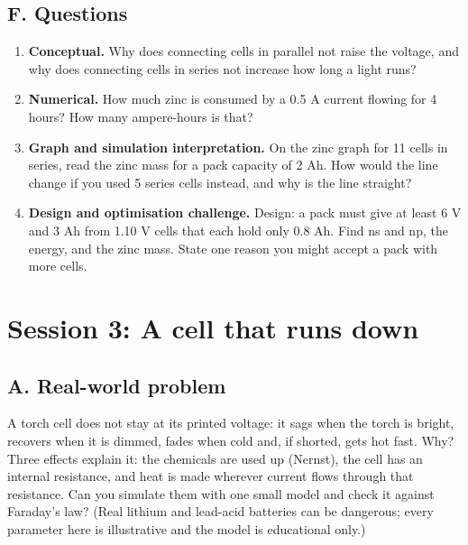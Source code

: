 \documentclass[11pt,a4paper]{article}
\begin{document}
\subsection*{F. Questions}
\begin{enumerate}[nosep]
\item \textbf{Conceptual.} Why does connecting cells in parallel not raise the voltage, and why does connecting cells in series not increase how long a light runs?
\item \textbf{Numerical.} How much zinc is consumed by a 0.5 A current flowing for 4 hours? How many ampere-hours is that?
\item \textbf{Graph and simulation interpretation.} On the zinc graph for 11 cells in series, read the zinc mass for a pack capacity of 2 Ah. How would the line change if you used 5 series cells instead, and why is the line straight?
\item \textbf{Design and optimisation challenge.} Design: a pack must give at least 6 V and 3 Ah from 1.10 V cells that each hold only 0.8 Ah. Find ns and np, the energy, and the zinc mass. State one reason you might accept a pack with more cells.
\end{enumerate}

\section{Session 3: A cell that runs down}

\subsection*{A. Real-world problem}
A torch cell does not stay at its printed voltage: it sags when the torch is bright, recovers when it is dimmed, fades when cold and, if shorted, gets hot fast. Why? Three effects explain it: the chemicals are used up (Nernst), the cell has an internal resistance, and heat is made wherever current flows through that resistance. Can you simulate them with one small model and check it against Faraday's law? (Real lithium and lead-acid batteries can be dangerous; every parameter here is illustrative and the model is educational only.)
\end{document}
